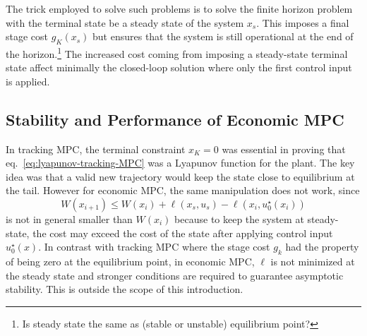 \documentclass[11pt]{report}
\begin{document}
The trick employed to solve such problems is to solve the finite horizon problem with the terminal state be a steady state of the system $x_s$. This imposes a final stage cost $g_K(x_s)$ but ensures that the system is still operational at the end of the horizon.\footnote{Is steady state the same as (stable or unstable) equilibrium point?} The increased cost coming from imposing a steady-state terminal state affect minimally the closed-loop solution where only the first control input is applied.

\subsection{Stability and Performance of Economic MPC}
\label{sec:stability-performance-economic-MPC}

In tracking MPC, the terminal constraint $x_K=0$ was essential in proving that eq.~\eqref{eq:lyapunov-tracking-MPC} was a Lyapunov function for the plant. The key idea was that a valid new trajectory would keep the state close to equilibrium at the tail. However for economic MPC, the same manipulation does not work, since
\begin{equation}
  \label{eq:eMPC-Lyapunov-like-inequality}
  W(x_{i+1}) \le W(x_i) + \ell(x_s,u_s) - \ell(x_i,u_0^\star(x_i))
\end{equation}
is not in general smaller than $W(x_i)$ because to keep the system at steady-state, the cost may exceed the cost of the state after applying control input $u_0^\star(x)$. In contrast with tracking MPC where the stage cost $g_k$ had the property of being zero at the equilibrium point, in economic MPC, $\ell$ is not minimized at the steady state and stronger conditions are required to guarantee asymptotic stability. This is outside the scope of this introduction.
\end{document}
